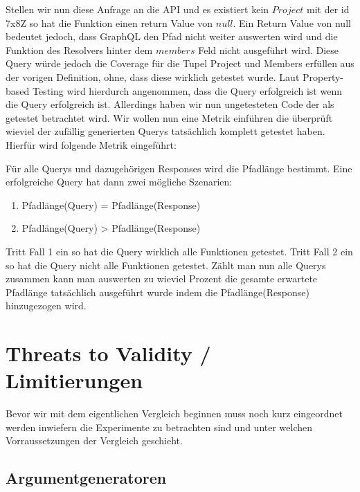 Stellen wir nun diese Anfrage an die API und es existiert kein $Project$ mit der id 7x8Z so hat die Funktion
einen return Value von $null$.
Ein Return Value von null bedeutet jedoch, dass GraphQL den Pfad nicht weiter auswerten wird und die Funktion des Resolvers hinter dem $members$ Feld nicht ausgeführt wird.
Diese Query würde jedoch die Coverage für die Tupel Project und Members erfüllen aus der vorigen Definition, ohne, dass diese wirklich getestet wurde.
Laut Property-based Testing wird hierdurch angenommen, dass die Query erfolgreich ist wenn die Query erfolgreich ist.
Allerdings haben wir nun ungetesteten Code der als getestet betrachtet wird.
Wir wollen nun eine Metrik einführen die überprüft wieviel der zufällig generierten Querys tatsächlich komplett getestet haben.
Hierfür wird folgende Metrik eingeführt:

\begin{definition}
    Für alle Querys und dazugehörigen Responses wird die Pfadlänge bestimmt.
    Eine erfolgreiche Query hat dann zwei mögliche Szenarien:
    \begin{enumerate}
        \item Pfadlänge(Query) = Pfadlänge(Response)
        \item Pfadlänge(Query) > Pfadlänge(Response)
    \end{enumerate}
\end{definition}

Tritt Fall 1 ein so hat die Query wirklich alle Funktionen getestet.
Tritt Fall 2 ein so hat die Query nicht alle Funktionen getestet.
Zählt man nun alle Querys zusammen kann man auswerten zu wieviel Prozent die gesamte erwartete Pfadlänge tatsächlich ausgeführt wurde indem die Pfadlänge(Response) hinzugezogen wird.

\section{Threats to Validity / Limitierungen}

Bevor wir mit dem eigentlichen Vergleich beginnen muss noch kurz eingeordnet werden inwiefern die Experimente zu betrachten
sind und unter welchen Vorraussetzungen der Vergleich geschieht.

\subsection{Argumentgeneratoren}

